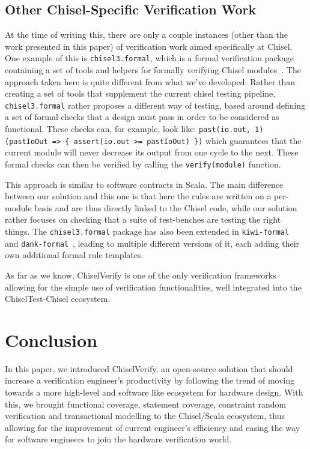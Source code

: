 \documentclass[conference]{IEEEtran}
\begin{document}
\subsection{Other Chisel-Specific Verification Work}
At the time of writing this, there are only a couple instances (other than the work presented in this paper) of verification work aimed specifically at Chisel. One example of this is \texttt{chisel3.formal}, which is a formal verification package containing a set of tools and helpers for formally verifying Chisel modules~\cite{chisel:formal}. The approach taken here is quite different from what we've developed. Rather than creating a set of tools that supplement the current chisel testing pipeline, \texttt{chisel3.formal} rather proposes a different way of testing, based around defining a set of formal checks that a design must pass in order to be considered as functional. These checks can, for example, look like: \texttt{past(io.out, 1) (pastIoOut => \{ assert(io.out >= pastIoOut) \})} which guarantees that the current module will never decrease its output from one cycle to the next. These formal checks can then be verified by calling the \texttt{verify(module)} function. 

This approach is similar to software contracts in Scala. The main difference between our solution and this one is that here the rules are written on a per-module basis and are thus directly linked to the Chisel code, while our solution rather focuses on checking that a suite of test-benches are testing the right things. The \texttt{chisel3.formal} package has also been extended in \texttt{kiwi-formal}~\cite{chisel:kiwi-formal} and \texttt{dank-formal}~\cite{chisel:dank-formal}, leading to multiple different versions of it, each adding their own additional formal rule templates. 

As far as we know, ChiselVerify is one of the only verification frameworks allowing for the simple use of verification functionalities, well integrated into the ChiselTest-Chisel ecosystem.

\section{Conclusion}
In this paper, we introduced ChiselVerify, an open-source solution that should increase a verification engineer's productivity by following the trend of moving towards a more high-level and software like ecosystem for hardware design. With this, we brought functional coverage, statement coverage, constraint random verification and transactional modelling to the Chisel/Scala ecosystem, thus allowing for the improvement of current engineer's efficiency and easing the way for software engineers to join the hardware verification world.
\end{document}

